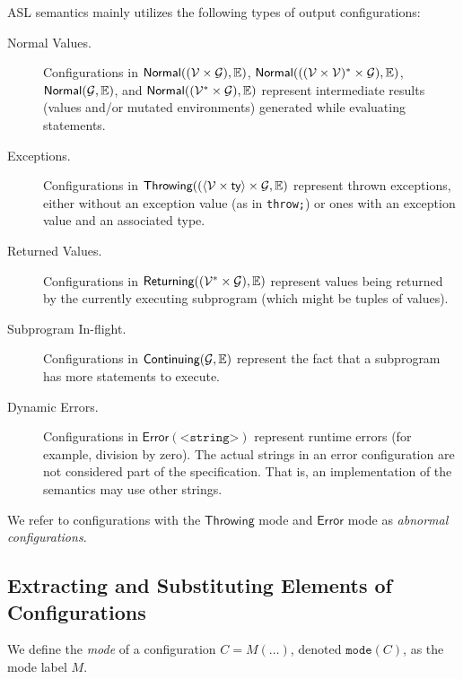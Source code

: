 \documentclass{book}
\newcommand\XGraphs[0]{\mathcal{G}}
\newcommand\vals[0]{\mathcal{V}}
\newcommand\configmode[1]{\texttt{mode}({#1})}
\newcommand\Normal[0]{\textsf{Normal}}
\newcommand\Throwing[0]{\textsf{Throwing}}
\newcommand\Continuing[0]{\textsf{Continuing}}
\newcommand\Returning[0]{\textsf{Returning}}
\newcommand\Error[0]{\textsf{Error}}
\begin{document}
ASL semantics mainly utilizes the following types of output configurations:
\begin{description}
  \item[Normal Values.] Configurations in $\Normal((\vals \times \XGraphs), \envs)$,
  $\Normal(((\vals \times \vals)^* \times \XGraphs), \envs)$, $\Normal(\XGraphs, \envs)$, and
  $\Normal((\vals^* \times \XGraphs), \envs)$
  represent intermediate results (values and/or mutated environments) generated while evaluating statements.

  \item[Exceptions.] Configurations in $\Throwing((\langle\vals \times \ty\rangle \times \XGraphs, \envs)$
  represent thrown exceptions,
  either without an exception value (as in \texttt{throw;}) or ones with an exception value and an associated type.

  \item[Returned Values.] Configurations in $\Returning((\vals^* \times \XGraphs), \envs)$
  represent values being returned by the currently executing subprogram
  (which might be tuples of values).

  \item[Subprogram In-flight.] Configurations in $\Continuing(\XGraphs, \envs)$
  represent the fact that a subprogram has more statements to execute.

  \item[Dynamic Errors.] Configurations in $\Error(\texttt{<string>})$
  represent runtime errors (for example, division by zero).
  The actual strings in an error configuration are not considered part of the specification.
  That is, an implementation of the semantics may use other strings.
\end{description}

We refer to configurations with the $\Throwing$ mode and $\Error$ mode as \emph{abnormal configurations}.

\subsection{Extracting and Substituting Elements of Configurations}

We define the \emph{mode} of a configuration $C=M(\ldots)$, denoted $\configmode{C}$, as the mode label $M$.
\end{document}
